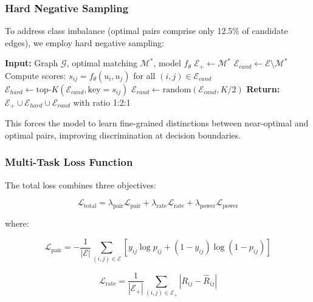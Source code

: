 \subsubsection{Hard Negative Sampling}

To address class imbalance (optimal pairs comprise only 12.5\% of candidate edges), we employ hard negative sampling:

\begin{algorithm}[!t]
\caption{Hard Negative Sampling Strategy}
\begin{algorithmic}[1]
\STATE \textbf{Input:} Graph $\mathcal{G}$, optimal matching $\mathcal{M}^*$, model $f_\theta$
\STATE $\mathcal{E}_+ \gets \mathcal{M}^*$ 
\STATE $\mathcal{E}_{cand} \gets \mathcal{E} \setminus \mathcal{M}^*$ 
\STATE Compute scores: $s_{ij} = f_\theta(u_i, u_j)$ for all $(i,j) \in \mathcal{E}_{cand}$
\STATE $\mathcal{E}_{hard} \gets \text{top-}K(\mathcal{E}_{cand}, \text{key}=s_{ij})$ 
\STATE $\mathcal{E}_{rand} \gets \text{random}(\mathcal{E}_{cand}, K/2)$ 
\STATE \textbf{Return:} $\mathcal{E}_+ \cup \mathcal{E}_{hard} \cup \mathcal{E}_{rand}$ with ratio 1:2:1
\end{algorithmic}
\end{algorithm}

This forces the model to learn fine-grained distinctions between near-optimal and optimal pairs, improving discrimination at decision boundaries.

\subsubsection{Multi-Task Loss Function}

The total loss combines three objectives:

\begin{equation}
\mathcal{L}_{\text{total}} = \lambda_{\text{pair}} \mathcal{L}_{\text{pair}} + \lambda_{\text{rate}} \mathcal{L}_{\text{rate}} + \lambda_{\text{power}} \mathcal{L}_{\text{power}}
\end{equation}

where:

\begin{equation}
\mathcal{L}_{\text{pair}} = -\frac{1}{|\mathcal{E}|} \sum_{(i,j) \in \mathcal{E}} \left[ y_{ij} \log p_{ij} + (1-y_{ij}) \log(1-p_{ij}) \right]
\end{equation}

\begin{equation}
\mathcal{L}_{\text{rate}} = \frac{1}{|\mathcal{E}_+|} \sum_{(i,j) \in \mathcal{E}_+} |R_{ij} - \hat{R}_{ij}|
\end{equation}

